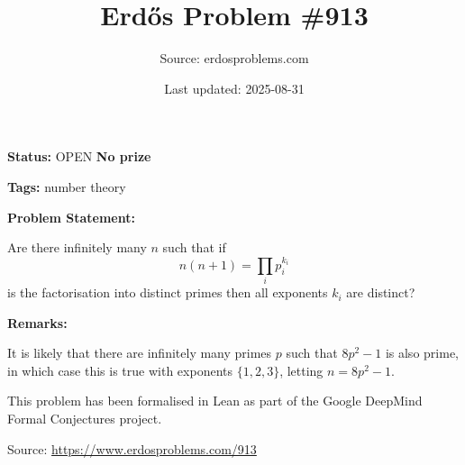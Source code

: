 \documentclass{article}
\title{Erd\H{o}s Problem \#913}
\date{Last updated: 2025-08-31}
\author{Source: erdosproblems.com}
\begin{document}
\maketitle

\noindent\textbf{Status:} OPEN \quad \textbf{No prize}

\noindent\textbf{Tags:} number theory

\medskip
\noindent\textbf{Problem Statement:}

Are there infinitely many $n$ such that if\[n(n+1) = \prod_i p_i^{k_i}\]is the factorisation into distinct primes then all exponents $k_i$ are distinct?

\bigskip
\noindent\textbf{Remarks:}

It is likely that there are infinitely many primes $p$ such that $8p^2-1$ is also prime, in which case this is true with exponents $\{1,2,3\}$, letting $n=8p^2-1$.

This problem has been formalised in Lean as part of the Google DeepMind Formal Conjectures project.

\bigskip
\noindent\small{Source: \url{https://www.erdosproblems.com/913}}
\end{document}
